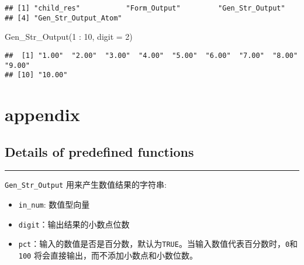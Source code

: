 \documentclass[
]{ctexart}
\newenvironment{Shaded}{\begin{snugshade}}{\end{snugshade}}
\newcommand{\AttributeTok}[1]{\textcolor[rgb]{0.77,0.63,0.00}{#1}}
\newcommand{\DecValTok}[1]{\textcolor[rgb]{0.00,0.00,0.81}{#1}}
\newcommand{\FunctionTok}[1]{\textcolor[rgb]{0.00,0.00,0.00}{#1}}
\newcommand{\NormalTok}[1]{#1}
\newcommand{\SpecialCharTok}[1]{\textcolor[rgb]{0.00,0.00,0.00}{#1}}
\begin{document}
\begin{verbatim}
## [1] "child_res"           "Form_Output"         "Gen_Str_Output"     
## [4] "Gen_Str_Output_Atom"
\end{verbatim}

\begin{Shaded}
\begin{Highlighting}[]
\FunctionTok{Gen\_Str\_Output}\NormalTok{(}\DecValTok{1} \SpecialCharTok{:} \DecValTok{10}\NormalTok{, }\AttributeTok{digit =} \DecValTok{2}\NormalTok{)}
\end{Highlighting}
\end{Shaded}

\begin{verbatim}
##  [1] "1.00"  "2.00"  "3.00"  "4.00"  "5.00"  "6.00"  "7.00"  "8.00"  "9.00" 
## [10] "10.00"
\end{verbatim}

\hypertarget{appendix}{%
\section{appendix}\label{appendix}}

\hypertarget{details-of-predefined-functions}{%
\subsection{Details of predefined
functions}\label{details-of-predefined-functions}}

\begin{center}\rule{0.5\linewidth}{0.5pt}\end{center}

\texttt{Gen\_Str\_Output} 用来产生数值结果的字符串:

\begin{itemize}
\item
  \texttt{in\_num}: 数值型向量
\item
  \texttt{digit}：输出结果的小数点位数
\item
  \texttt{pct}：输入的数值是否是百分数，默认为\texttt{TRUE}。当输入数值代表百分数时，\texttt{0}和\texttt{100}
  将会直接输出，而不添加小数点和小数位数。
\end{itemize}
\end{document}
